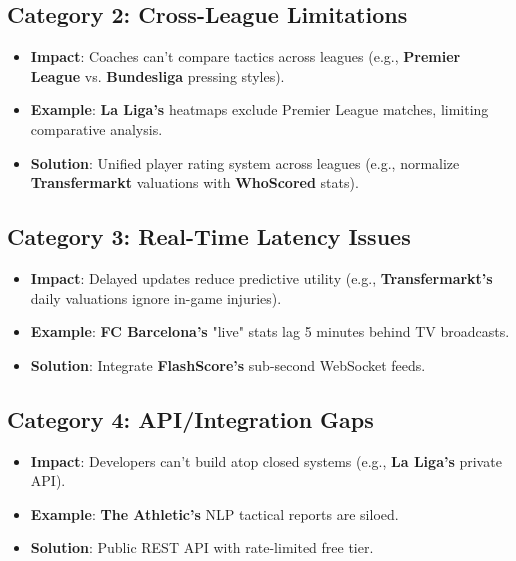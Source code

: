 \subsection{Category 2: Cross-League Limitations}
\begin{itemize}
\item \textbf{Impact}: Coaches can’t compare tactics across leagues (e.g., \textbf{Premier League} vs. \textbf{Bundesliga} pressing styles).
\item \textbf{Example}: \textbf{La Liga’s} heatmaps exclude Premier League matches, limiting comparative analysis.
\item \textbf{Solution}: Unified player rating system across leagues (e.g., normalize \textbf{Transfermarkt} valuations with \textbf{WhoScored} stats).
\end{itemize}

\subsection{Category 3: Real-Time Latency Issues}
\begin{itemize}
\item \textbf{Impact}: Delayed updates reduce predictive utility (e.g., \textbf{Transfermarkt’s} daily valuations ignore in-game injuries).
\item \textbf{Example}: \textbf{FC Barcelona’s} "live" stats lag 5 minutes behind TV broadcasts.
\item \textbf{Solution}: Integrate \textbf{FlashScore’s} sub-second WebSocket feeds.
\end{itemize}

\subsection{Category 4: API/Integration Gaps}
\begin{itemize}
\item \textbf{Impact}: Developers can’t build atop closed systems (e.g., \textbf{La Liga’s} private API).
\item \textbf{Example}: \textbf{The Athletic’s} NLP tactical reports are siloed.
\item \textbf{Solution}: Public REST API with rate-limited free tier.
\end{itemize}

